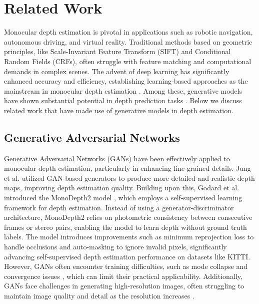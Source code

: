 \section{Related Work}
Monocular depth estimation is pivotal in applications such as robotic navigation, autonomous driving, and virtual reality. Traditional methods based on geometric principles, like Scale-Invariant Feature Transform (SIFT) and Conditional Random Fields (CRFs), often struggle with feature matching and computational demands in complex scenes. The advent of deep learning has significantly enhanced accuracy and efficiency, establishing learning-based approaches as the mainstream in monocular depth estimation \cite{c2}. Among these, generative models have shown substantial potential in depth prediction tasks \cite{c5}\cite{c8}\cite{c11}\cite{c19}. Below we discuss related work that have made use of generative models in depth estimation. 

\subsection{Generative Adversarial Networks}
Generative Adversarial Networks (GANs) \cite{c20} have been effectively applied to monocular depth estimation, particularly in enhancing fine-grained details. Jung et al. \cite{c5} utilized GAN-based generators to produce more detailed and realistic depth maps, improving depth estimation quality. Building upon this, Godard et al. introduced the MonoDepth2 model \cite{c19}, which employs a self-supervised learning framework for depth estimation. Instead of using a generator-discriminator architecture, MonoDepth2 relies on photometric consistency between consecutive frames or stereo pairs, enabling the model to learn depth without ground truth labels. The model introduces improvements such as minimum reprojection loss to handle occlusions and auto-masking to ignore invalid pixels, significantly advancing self-supervised depth estimation performance on datasets like KITTI. However, GANs often encounter training difficulties, such as mode collapse and convergence issues \cite{c6, c21}, which can limit their practical applicability. Additionally, GANs face challenges in generating high-resolution images, often struggling to maintain image quality and detail as the resolution increases \cite{c22}\cite{c23}.

